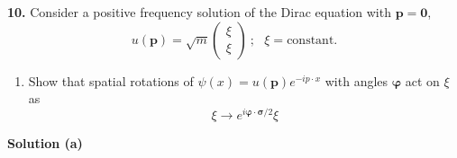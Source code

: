 \documentclass[12pt]{article}
\begin{document}
\pagestyle{fancy}

\textbf{10.} Consider a positive frequency solution of the Dirac equation with $\mathbf{p} = \mathbf{0}$,
\[
    u(\mathbf{p}) = \sqrt{m}\begin{pmatrix}\xi \\ \xi\end{pmatrix} ~ ; ~~~ \xi = \text{constant.}
\]
\begin{enumerate}[label=(\alph*), start = 1]
    \item Show that spatial rotations of $\psi(x) = u(\mathbf{p})e^{-ip\cdot x}$ with angles $\bm{\varphi}$ act on $\xi$ as
        \[
            \xi \longrightarrow e^{i\bm{\varphi}\cdot\bm{\sigma}/2}\xi
        \]
\end{enumerate}

\color{blue}

\textbf{Solution (a)}
\end{document}
